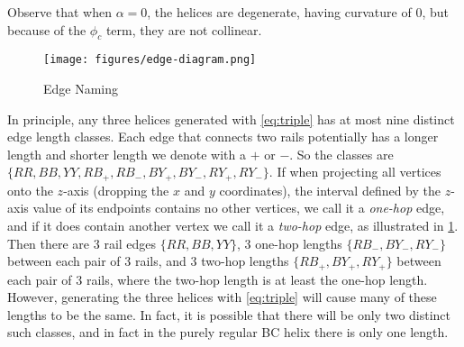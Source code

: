 \documentclass[10pt,final]{journals-1.0/asme2ej}
\begin{document}
Observe that when $\alpha = 0$, the helices are degenerate, having curvature of $0$,
but because of the $\phi_c$ term, they are not collinear.

\begin{figure}
  \centering
     \texttt{[image: figures/edge-diagram.png]}
     \caption{Edge Naming}
  \label{fig:naming}
\end{figure}

In principle, any three helices generated with \cref{eq:triple}
has at most nine distinct edge length classes. Each edge that connects
two rails potentially has a longer length and shorter length we denote with
a $+$ or $-$. So the classes are $\{ RR, BB, YY, RB_+, RB_-, BY_+, BY_-, RY_+, RY_- \}$.
If when projecting all vertices onto the $z$-axis (dropping the $x$ and $y$ coordinates),
the interval
defined by the $z$-axis value of its endpoints contains no other vertices,
we call it a \emph{one-hop} edge, and if it does contain another vertex we
call it a \emph{two-hop} edge, as illustrated in \cref{fig:naming}.
Then there are 
3 rail edges $\{ RR, BB, YY\}$,
3 one-hop lengths $\{ RB_-, BY_-, RY_- \}$ between each pair of 3 rails,
and 3 two-hop
lengths $\{ RB_{+}, BY_+, RY_+ \}$ between each pair of 3 rails,
where the two-hop length is at least the one-hop length.
However, generating the three helices with \cref{eq:triple}
 will cause
many of these lengths to be the same.
In fact, it is possible that there
will be only two distinct such classes, and in fact in  the purely regular BC helix there is only one length.
\end{document}
